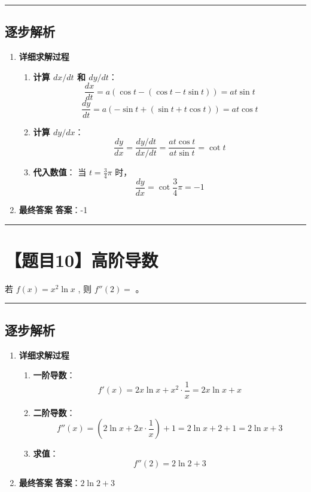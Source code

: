 \documentclass[UTF8]{ctexart}
\newenvironment{redenv}{\color{red}}{}
\newenvironment{detailedanalysis}{%
    \color{red}
    \begin{enumerate}[label=\textbf{第\arabic*步：}, leftmargin=*, align=left, itemsep=1.5ex]
}{%
    \end{enumerate}
}
\newcommand{\problemrule}{\noindent\rule{\textwidth}{1.5pt}\vspace{-0.8em}}
\newcommand{\analysisrule}{\noindent\rule{\textwidth}{0.8pt}\vspace{-0.8em}}
\newcommand{\blank}[1]{\underline{\hspace{#1}}}
\begin{document}
\begin{redenv}
\analysisrule
\subsection*{逐步解析}

\begin{detailedanalysis}
\item \textbf{详细求解过程}
\begin{enumerate}[label=(\arabic*)]
\item \textbf{计算 $dx/dt$ 和 $dy/dt$}：
$$ \frac{dx}{dt} = a(\cos t - (\cos t - t\sin t)) = at\sin t $$
$$ \frac{dy}{dt} = a(-\sin t + (\sin t + t\cos t)) = at\cos t $$
\item \textbf{计算 $dy/dx$}：
$$ \frac{dy}{dx} = \frac{dy/dt}{dx/dt} = \frac{at\cos t}{at\sin t} = \cot t $$
\item \textbf{代入数值}：
当 $t = \frac{3}{4}\pi$ 时，
$$ \frac{dy}{dx} = \cot \frac{3}{4}\pi = -1 $$
\end{enumerate}

\item \textbf{最终答案}
\textbf{答案}：-1
\end{detailedanalysis}
\end{redenv}

\problemrule
\section*{【题目10】高阶导数}
若 $ f(x) = x^{2} \ln x $ , 则 $ f''(2) = $ \blank{2cm}。

\begin{redenv}
\analysisrule
\subsection*{逐步解析}

\begin{detailedanalysis}
\item \textbf{详细求解过程}
\begin{enumerate}[label=(\arabic*)]
\item \textbf{一阶导数}：
$$ f'(x) = 2x \ln x + x^2 \cdot \frac{1}{x} = 2x \ln x + x $$
\item \textbf{二阶导数}：
$$ f''(x) = (2 \ln x + 2x \cdot \frac{1}{x}) + 1 = 2 \ln x + 2 + 1 = 2 \ln x + 3 $$
\item \textbf{求值}：
$$ f''(2) = 2 \ln 2 + 3 $$
\end{enumerate}

\item \textbf{最终答案}
\textbf{答案}：$ 2\ln 2 + 3 $
\end{detailedanalysis}
\end{redenv}
\end{document}
